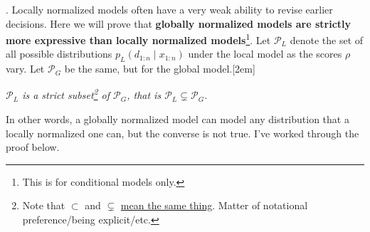 \documentclass[11pt]{article}
\begin{document}
\myspace
\p {}. Locally normalized models often have a very weak ability to revise earlier decisions. Here we will prove that \textbf{globally normalized models are strictly more expressive than locally normalized models}\footnote{This is for conditional models only.}. Let $\mathcal{P}_L$ denote the set of all possible distributions $p_L(d_{1:n} \mid x_{1:n})$ under the local model as the scores $\rho$ vary. Let $\mathcal{P}_G$ be the same, but for the global model.[2em]
\begin{center}
	 {\itshape $\mathcal{P}_L$ is a strict subset\footnote{Note that $\subset$ and $\subsetneq$ \href{https://math.stackexchange.com/questions/1191715}{mean the same thing}. Matter of notational preference/being explicit/etc.} of $\mathcal{P}_G$, that is $\mathcal{P}_L \subsetneq \mathcal{P}_G$. }
\end{center}
In other words, a globally normalized model can model any distribution that a locally normalized one can, but the converse is not true. I've worked through the proof below.
\end{document}

